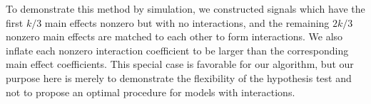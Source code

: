 \documentclass{imsart}
\newcommand{\argmax}{\mathop{\mathrm{argmax}}}
\newcommand{\norm}[1]{\lVert #1 \rVert}
\begin{document}

To demonstrate this method by simulation, we constructed signals which have
the first $k/3$ main effects nonzero but with no interactions, and the
remaining $2k/3$ nonzero main effects are matched to each other to form
interactions.
We also inflate each nonzero interaction
coefficient to be larger than the corresponding main
effect coefficients. This special case is favorable for our algorithm,
but our purpose here is merely to demonstrate the flexibility of the
hypothesis test and not to propose an optimal procedure for models with
interactions.
\end{document}
